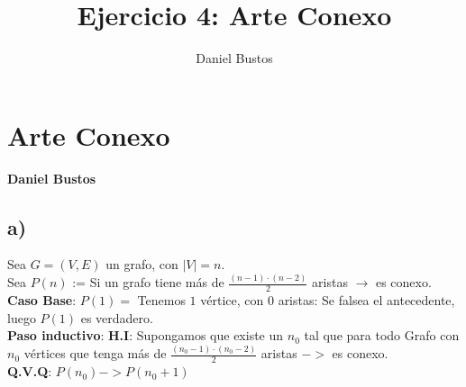 \documentclass{article}
\author{Daniel Bustos}
\title{Ejercicio 4: Arte Conexo}
\begin{document}
\section{Arte Conexo}
\textbf{Daniel Bustos}
\subsection{a)}
Sea $G = (V,E)$ un grafo, con $|V| = n$. \\
Sea $P(n)$ := Si un grafo tiene más de $\frac{(n-1) \cdot (n-2)}{2}$ aristas $\rightarrow$ es conexo. \\

\textbf{Caso Base}: $P(1) =$ Tenemos $1$ vértice, con $0$ aristas: Se falsea el antecedente, luego $P(1)$ es verdadero. \\

\textbf{Paso inductivo}: \textbf{H.I}: Supongamos que existe un $n_0$ tal que para todo Grafo con $n_0$ vértices que tenga más de $\frac{(n_0 - 1) \cdot (n_0 - 2)}{2}$ aristas $->$ es conexo. \\

\textbf{Q.V.Q}: $P(n_0) -> P(n_0  + 1)$ \\
\end{document}
